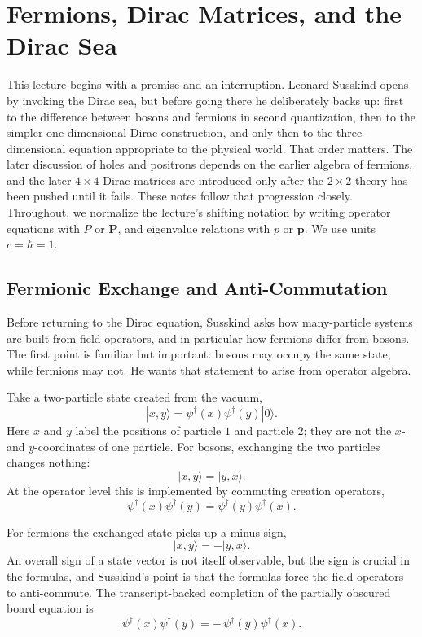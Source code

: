 \chapter{Fermions, Dirac Matrices, and the Dirac Sea}

This lecture begins with a promise and an interruption. Leonard Susskind opens by invoking the Dirac sea, but before going there he deliberately backs up: first to the difference between bosons and fermions in second quantization, then to the simpler one-dimensional Dirac construction, and only then to the three-dimensional equation appropriate to the physical world. That order matters. The later discussion of holes and positrons depends on the earlier algebra of fermions, and the later \(4\times 4\) Dirac matrices are introduced only after the \(2\times 2\) theory has been pushed until it fails. These notes follow that progression closely. Throughout, we normalize the lecture's shifting notation by writing operator equations with \(P\) or \(\mathbf P\), and eigenvalue relations with \(p\) or \(\mathbf p\). We use units \(c=\hbar=1\).

\section{Fermionic Exchange and Anti-Commutation}

Before returning to the Dirac equation, Susskind asks how many-particle systems are built from field operators, and in particular how fermions differ from bosons. The first point is familiar but important: bosons may occupy the same state, while fermions may not. He wants that statement to arise from operator algebra.

Take a two-particle state created from the vacuum,
\begin{equation}
|x,y\rangle=\psi^\dagger(x)\psi^\dagger(y)|0\rangle.
\end{equation}
Here \(x\) and \(y\) label the positions of particle \(1\) and particle \(2\); they are not the \(x\)- and \(y\)-coordinates of one particle. For bosons, exchanging the two particles changes nothing:
\begin{equation}
|x,y\rangle=|y,x\rangle.
\end{equation}
At the operator level this is implemented by commuting creation operators,
\begin{equation}
\psi^\dagger(x)\psi^\dagger(y)=\psi^\dagger(y)\psi^\dagger(x).
\end{equation}

For fermions the exchanged state picks up a minus sign,
\begin{equation}
|x,y\rangle=-|y,x\rangle.
\end{equation}
An overall sign of a state vector is not itself observable, but the sign is crucial in the formulas, and Susskind's point is that the formulas force the field operators to anti-commute. The transcript-backed completion of the partially obscured board equation is
\begin{equation}
\psi^\dagger(x)\psi^\dagger(y)=-\,\psi^\dagger(y)\psi^\dagger(x).
\end{equation}


